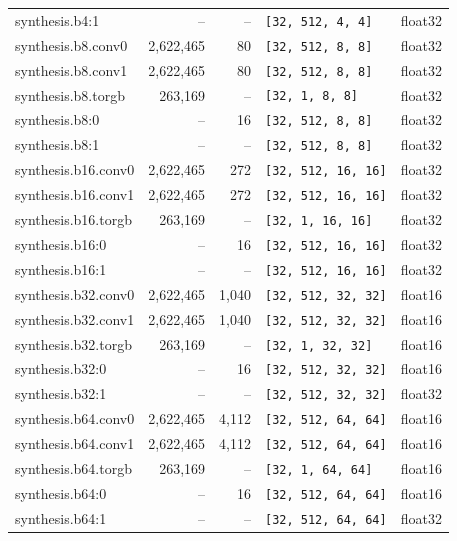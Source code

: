 \begin{footnotesize}
\begin{longtable}{@{}lrrll@{}}
synthesis.b4:1       & --        & --     & \texttt{[32, 512, 4, 4]}      & float32 \\
synthesis.b8.conv0   & 2{,}622{,}465 & 80 & \texttt{[32, 512, 8, 8]}      & float32 \\
synthesis.b8.conv1   & 2{,}622{,}465 & 80 & \texttt{[32, 512, 8, 8]}      & float32 \\
synthesis.b8.torgb   & 263{,}169 & --     & \texttt{[32, 1, 8, 8]}        & float32 \\
synthesis.b8:0       & --        & 16     & \texttt{[32, 512, 8, 8]}      & float32 \\
synthesis.b8:1       & --        & --     & \texttt{[32, 512, 8, 8]}      & float32 \\
synthesis.b16.conv0  & 2{,}622{,}465 & 272 & \texttt{[32, 512, 16, 16]}    & float32 \\
synthesis.b16.conv1  & 2{,}622{,}465 & 272 & \texttt{[32, 512, 16, 16]}    & float32 \\
synthesis.b16.torgb  & 263{,}169 & --     & \texttt{[32, 1, 16, 16]}      & float32 \\
synthesis.b16:0      & --        & 16     & \texttt{[32, 512, 16, 16]}    & float32 \\
synthesis.b16:1      & --        & --     & \texttt{[32, 512, 16, 16]}    & float32 \\
synthesis.b32.conv0  & 2{,}622{,}465 & 1{,}040 & \texttt{[32, 512, 32, 32]} & float16 \\
synthesis.b32.conv1  & 2{,}622{,}465 & 1{,}040 & \texttt{[32, 512, 32, 32]} & float16 \\
synthesis.b32.torgb  & 263{,}169 & --     & \texttt{[32, 1, 32, 32]}      & float16 \\
synthesis.b32:0      & --        & 16     & \texttt{[32, 512, 32, 32]}    & float16 \\
synthesis.b32:1      & --        & --     & \texttt{[32, 512, 32, 32]}    & float32 \\
synthesis.b64.conv0  & 2{,}622{,}465 & 4{,}112 & \texttt{[32, 512, 64, 64]} & float16 \\
synthesis.b64.conv1  & 2{,}622{,}465 & 4{,}112 & \texttt{[32, 512, 64, 64]} & float16 \\
synthesis.b64.torgb  & 263{,}169 & --     & \texttt{[32, 1, 64, 64]}      & float16 \\
synthesis.b64:0      & --        & 16     & \texttt{[32, 512, 64, 64]}    & float16 \\
synthesis.b64:1      & --        & --     & \texttt{[32, 512, 64, 64]}    & float32 \\

\end{longtable}
\end{footnotesize}
